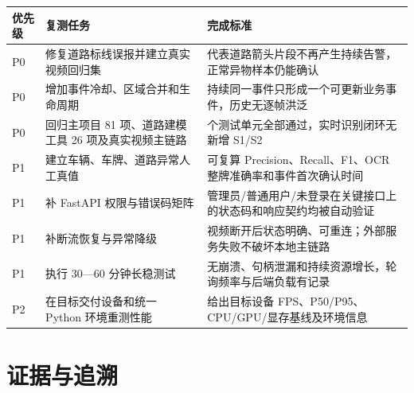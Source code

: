 \begin{longtable}[]{@{}
  >{\raggedright\arraybackslash}p{}
  >{\raggedright\arraybackslash}p{}
  >{\raggedright\arraybackslash}p{}@{}}
\toprule\noalign{}
\begin{minipage}[b]{\linewidth}\raggedright
优先级
\end{minipage} & \begin{minipage}[b]{\linewidth}\raggedright
复测任务
\end{minipage} & \begin{minipage}[b]{\linewidth}\raggedright
完成标准
\end{minipage} \\
\midrule\noalign{}
\endhead
\bottomrule\noalign{}
\endlastfoot
P0 & 修复道路标线误报并建立真实视频回归集 & 代表道路箭头片段不再产生持续告警，正常异物样本仍能确认 \\
P0 & 增加事件冷却、区域合并和生命周期 & 持续同一事件只形成一个可更新业务事件，历史无逐帧洪泛 \\
P0 & 回归主项目 81 项、道路建模工具 26 项及真实视频主链路 & 107 个测试单元全部通过，实时识别闭环无新增 S1/S2 \\
P1 & 建立车辆、车牌、道路异常人工真值 & 可复算 Precision、Recall、F1、OCR 整牌准确率和事件首次确认时间 \\
P1 & 补 FastAPI 权限与错误码矩阵 & 管理员/普通用户/未登录在关键接口上的状态码和响应契约均被自动验证 \\
P1 & 补断流恢复与异常降级 & 视频断开后状态明确、可重连；外部服务失败不破坏本地主链路 \\
P1 & 执行 30---60 分钟长稳测试 & 无崩溃、句柄泄漏和持续资源增长，轮询频率与后端负载有记录 \\
P2 & 在目标交付设备和统一 Python 环境重测性能 & 给出目标设备 FPS、P50/P95、CPU/GPU/显存基线及环境信息 \\
\end{longtable}

\section{证据与追溯}\label{test-ux8bc1ux636eux4e0eux8ffdux6eaf}

